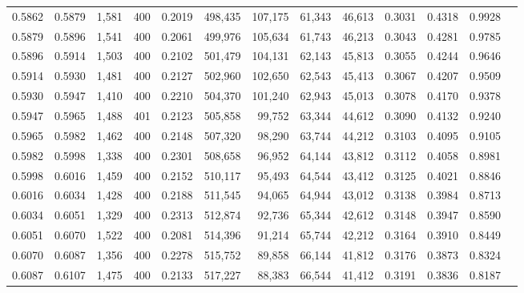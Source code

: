 \begin{tabular}{rrrrrrrrrrrrr}
0.5862 & 0.5879 &  1,581 & 400 &                                     0.2019 & 498,435 & 107,175 &  61,343 &  46,613 & 0.3031 & 0.4318 & 0.9928 \\
0.5879 & 0.5896 &  1,541 & 400 &                                     0.2061 & 499,976 & 105,634 &  61,743 &  46,213 & 0.3043 & 0.4281 & 0.9785 \\
0.5896 & 0.5914 &  1,503 & 400 &                                     0.2102 & 501,479 & 104,131 &  62,143 &  45,813 & 0.3055 & 0.4244 & 0.9646 \\
0.5914 & 0.5930 &  1,481 & 400 &                                     0.2127 & 502,960 & 102,650 &  62,543 &  45,413 & 0.3067 & 0.4207 & 0.9509 \\
0.5930 & 0.5947 &  1,410 & 400 &                                     0.2210 & 504,370 & 101,240 &  62,943 &  45,013 & 0.3078 & 0.4170 & 0.9378 \\
0.5947 & 0.5965 &  1,488 & 401 &                                     0.2123 & 505,858 &  99,752 &  63,344 &  44,612 & 0.3090 & 0.4132 & 0.9240 \\
0.5965 & 0.5982 &  1,462 & 400 &                                     0.2148 & 507,320 &  98,290 &  63,744 &  44,212 & 0.3103 & 0.4095 & 0.9105 \\
0.5982 & 0.5998 &  1,338 & 400 &                                     0.2301 & 508,658 &  96,952 &  64,144 &  43,812 & 0.3112 & 0.4058 & 0.8981 \\
0.5998 & 0.6016 &  1,459 & 400 &                                     0.2152 & 510,117 &  95,493 &  64,544 &  43,412 & 0.3125 & 0.4021 & 0.8846 \\
0.6016 & 0.6034 &  1,428 & 400 &                                     0.2188 & 511,545 &  94,065 &  64,944 &  43,012 & 0.3138 & 0.3984 & 0.8713 \\
0.6034 & 0.6051 &  1,329 & 400 &                                     0.2313 & 512,874 &  92,736 &  65,344 &  42,612 & 0.3148 & 0.3947 & 0.8590 \\
0.6051 & 0.6070 &  1,522 & 400 &                                     0.2081 & 514,396 &  91,214 &  65,744 &  42,212 & 0.3164 & 0.3910 & 0.8449 \\
0.6070 & 0.6087 &  1,356 & 400 &                                     0.2278 & 515,752 &  89,858 &  66,144 &  41,812 & 0.3176 & 0.3873 & 0.8324 \\
0.6087 & 0.6107 &  1,475 & 400 &                                     0.2133 & 517,227 &  88,383 &  66,544 &  41,412 & 0.3191 & 0.3836 & 0.8187 \\

\end{tabular}
